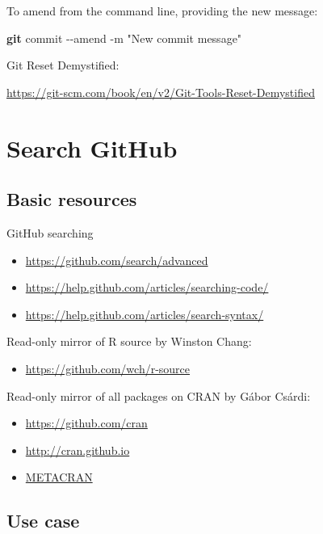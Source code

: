 \documentclass[
]{book}
\newenvironment{Shaded}{\begin{snugshade}}{\end{snugshade}}
\newcommand{\AttributeTok}[1]{\textcolor[rgb]{0.13,0.29,0.53}{#1}}
\newcommand{\FunctionTok}[1]{\textcolor[rgb]{0.13,0.29,0.53}{\textbf{#1}}}
\newcommand{\NormalTok}[1]{#1}
\newcommand{\StringTok}[1]{\textcolor[rgb]{0.31,0.60,0.02}{#1}}
\providecommand{\tightlist}{%
  \setlength{\itemsep}{0pt}\setlength{\parskip}{0pt}}
\begin{document}
To amend from the command line, providing the new message:

\begin{Shaded}
\begin{Highlighting}[]
\FunctionTok{git}\NormalTok{ commit }\AttributeTok{{-}{-}amend} \AttributeTok{{-}m} \StringTok{"New commit message"}
\end{Highlighting}
\end{Shaded}

Git Reset Demystified:

\url{https://git-scm.com/book/en/v2/Git-Tools-Reset-Demystified}

\chapter{Search GitHub}\label{search}

\section{Basic resources}\label{basic-resources}

GitHub searching

\begin{itemize}
\tightlist
\item
  \url{https://github.com/search/advanced}
\item
  \url{https://help.github.com/articles/searching-code/}
\item
  \url{https://help.github.com/articles/search-syntax/}
\end{itemize}

Read-only mirror of R source by Winston Chang:

\begin{itemize}
\tightlist
\item
  \url{https://github.com/wch/r-source}
\end{itemize}

Read-only mirror of all packages on CRAN by Gábor Csárdi:

\begin{itemize}
\tightlist
\item
  \url{https://github.com/cran}
\item
  \url{http://cran.github.io}
\item
  \href{http://www.r-pkg.org}{METACRAN}
\end{itemize}

\section{Use case}\label{use-case}
\end{document}
